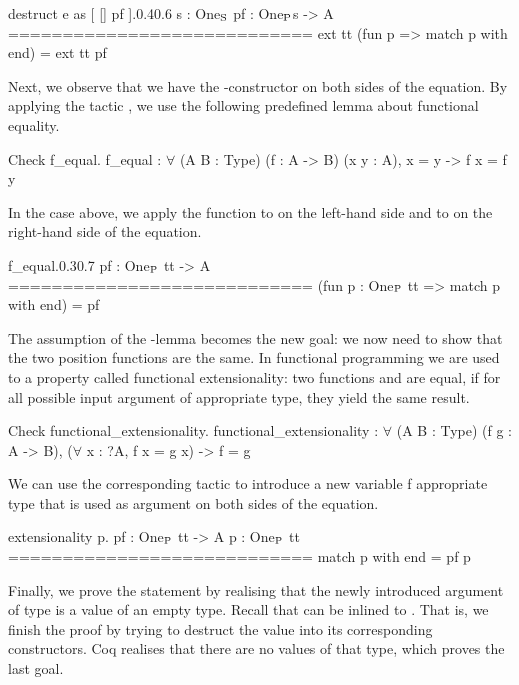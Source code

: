 \begin{cproof1}{destruct e as [ [] pf ].}{0.4}{0.6}
  s : One\(\sb{\text{S}}\)
  pf : One\(\sb{\text{P}}\)s -> A
  ============================
  ext tt (fun p => match p with end) =
  ext tt pf
\end{cproof1}

Next, we observe that we have the -constructor on both sides of the equation.
By applying the tactic , we use the following predefined lemma about functional equality.

\begin{crepl}
\coqrepl Check f_equal.
  f_equal : \(\forall\) (A B : Type) (f : A -> B) (x y : A), x = y -> f x = f y
\end{crepl}

In the case above, we apply the function  to  on the left-hand side and to  on the right-hand side of the equation.
 
\begin{cproof1}{f_equal.}{0.3}{0.7}
  pf : One\(\sb{\text{P}}\) tt -> A
  ============================
  (fun p : One\(\sb{\text{P}}\) tt => match p with end) = pf
\end{cproof1}

The assumption of the -lemma becomes the new goal: we now need to show that the two position functions are the same.
In functional programming we are used to a property called functional extensionality: two functions  and  are equal, if for all possible input argument of appropriate type, they yield the same result.

\begin{crepl}
\coqrepl Check  functional_extensionality.
  functional_extensionality : \(\forall\) (A B : Type) (f g : A -> B),
    (\(\forall\) x : ?A, f x = g x) -> f = g
\end{crepl}

We can use the corresponding tactic  to introduce a new variable  f appropriate type that is used as argument on both sides of the equation.

\begin{cproof}{extensionality p.}
  pf : One\(\sb{\text{P}}\) tt -> A
  p : One\(\sb{\text{P}}\) tt
  ============================
  match p with end = pf p
\end{cproof}

Finally, we prove the statement by realising that the newly introduced argument  of type  is a value of an empty type.
Recall that  can be inlined to .
That is, we finish the proof by trying to destruct the value  into its corresponding constructors.
Coq realises that there are no values of that type, which proves the last goal.

